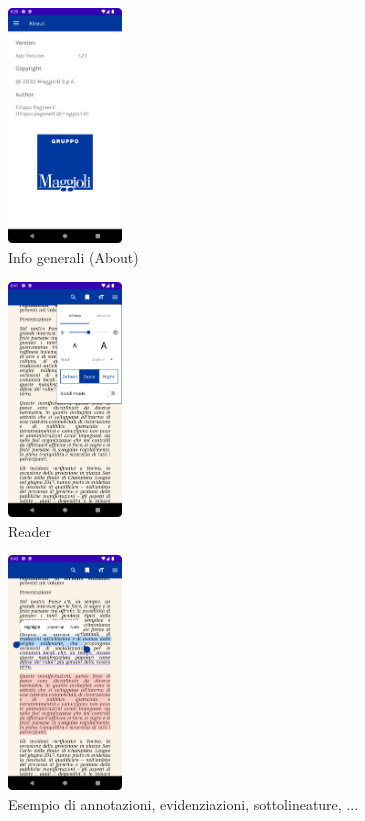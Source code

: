 \begin{multicols}{3}
            \begin{figure}[H]
                \centering
                \includegraphics[width=0.27\textwidth]{img/about.png}
                \caption{Info generali (About)}
                \label{about-android}
            \end{figure}

            \begin{figure}[H]
                \centering
                \includegraphics[width=0.27\textwidth]{img/reader_settings.png}
                \caption{Reader}
                \label{readersettings-android}
            \end{figure}
            
            \begin{figure}[H]
                \centering
                \includegraphics[width=0.27\textwidth]{img/annotations.png}
                \caption{Esempio di annotazioni, evidenziazioni, sottolineature, ...}
                \label{annotations-android}
            \end{figure}
            

\end{multicols}
